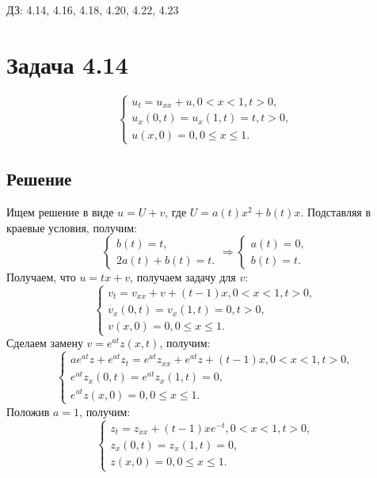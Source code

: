 \documentclass[11pt]{article}
\author{Sergey Makarov}
\date{\today}
\title{}
\begin{document}
ДЗ: 4.14, 4.16, 4.18, 4.20, 4.22, 4.23
\section{Задача 4.14}
\label{sec:org938e5a9}
\begin{equation}
\begin{cases}
u_t = u_{xx} + u, 0 < x < 1, t > 0, \\
u_x(0, t) = u_x(1, t) = t, t > 0, \\
u(x, 0) = 0, 0 \leq x \leq 1.
\end{cases}
\end{equation}
\subsection{Решение}
\label{sec:orgd2b28ea}
Ищем решение в виде $u = U + v$, где $U = a(t)x^2 + b(t)x$. Подставляя в краевые условия, получим:
\begin{equation}
\begin{cases}
b(t) = t, \\
2a(t) + b(t) = t.
\end{cases}
\Rightarrow
\begin{cases}
a(t) = 0, \\
b(t) = t.
\end{cases}
\end{equation}
Получаем, что $u = tx + v$, получаем задачу для $v$:
\begin{equation}
\begin{cases}
v_t = v_{xx} + v + (t - 1)x, 0 < x < 1, t > 0, \\
v_x(0, t) = v_x(1, t) = 0, t > 0, \\
v(x, 0) = 0, 0 \leq x \leq 1.
\end{cases}
\end{equation}
Сделаем замену $v = e^{at}z(x, t)$, получим:
\begin{equation*}
\begin{cases}
ae^{at}z + e^{at}z_t = e^{at}z_{xx} + e^{at}z + (t - 1)x, 0 < x < 1, t > 0, \\
e^{at}z_x(0, t) = e^{at}z_x(1, t) = 0, \\
e^{at}z(x, 0) = 0, 0 \leq x \leq 1.
\end{cases}
\end{equation*}
Положив $a = 1$, получим:
\begin{equation}
\begin{cases}
z_t = z_{xx} + (t - 1)xe^{-t}, 0 < x < 1, t > 0, \\
z_x(0, t) = z_x(1, t) = 0, \\
z(x, 0) = 0, 0 \leq x \leq 1.
\end{cases}
\end{equation}
\end{document}
